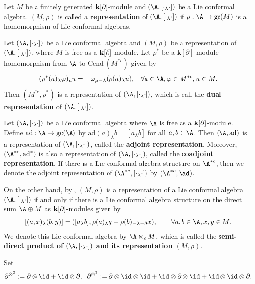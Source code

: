 \documentclass[12pt]{amsart}
\begin{document}
    \begin{definition}\cite{K1}
        Let $M$ be a finitely generated ${\bf k}[\partial]$-module and $(\A,[\cdot_\lambda \cdot])$ be a Lie conformal algebra. $(M, \rho)$ is called a {\bf  representation} of $(\A,[\cdot_\lambda \cdot])$ if $\rho: \A\rightarrow \text{gc}(M)$ is a homomorphism of Lie conformal algebras.
    \end{definition}

    \begin{proposition}\cite{L}\label{prop-dual}
        Let $(\A,[\cdot_\lambda \cdot])$ be a Lie conformal algebra and $(M, \rho)$ be a representation of $(\A,[\cdot_\lambda \cdot])$, where $M$ is free as a ${\bf k}[\partial]$-module. Let $\rho^*$ be a $\mathbf{k}[\partial]$-module homomorphism from $\A$ to $\mathrm{Cend}~(M^{*c})$ given by
        \begin{eqnarray*}
            (\rho^\ast(a)_\lambda \varphi)_\mu u=-\varphi_{\mu-\lambda}(\rho(a)_\lambda u),\;\;\;\forall a\in \A, \varphi\in M^{\ast c}, u\in M.
        \end{eqnarray*}
        Then   $(M^{\ast c}, \rho^\ast)$ is a representation of $(\A,[ \cdot_\lambda\cdot])$, which is call the {\bf  dual representation}  of $(\A,[ \cdot_\lambda\cdot])$.
         \end{proposition}
        \begin{example}
        	Let $(\A,[\cdot_\lambda \cdot])$ be a Lie conformal algebra where $\A$ is free as a ${\bf k}[\partial]$-module.
        Define $\mathrm{ad}:\A\rightarrow \text{gc}(\A)$ by $\mathrm{ad}(a)_\lambda b=[a_\lambda b]$ for all $a,b\in \A$. Then $(\A,\mathrm{ad})$ is a representation of $(\A,[\cdot_\lambda \cdot])$, called the {\bf adjoint representation}. Moreover, $(\A^{*c},\mathrm{ad}^*)$ is also a representation of $(\A,[\cdot_\lambda \cdot])$, called the {\bf coadjoint representation}. If there is a Lie conformal algebra structure on $\A^{\ast c}$, then we denote the adjoint representation of $(\A^{\ast c}, [\cdot_\lambda \cdot])$ by $(\A^{\ast c}, \ad)$.

        On the other hand, by \cite[Proposition 3.1]{HL1}, $(M,\rho)$ is a representation of a Lie conformal algebra $(\A,[\cdot_\lambda\cdot])$ if and only if there is a Lie conformal algebra structure on the direct sum $\A\oplus M$ as ${\bf k}[\partial]$-modules given by
        \begin{equation}\label{eq-rep}
            [(a,x)_\lambda (b,y)]=([a_\lambda b],\rho(a)_\lambda y-\rho(b)_{-\lambda-\partial}x),\qquad \forall a,b\in\A,x,y\in M.
        \end{equation}
        We denote this Lie conformal algebra by $\A\ltimes_{\rho} M$, which is called the {\bf semi-direct product of $(\A,[\cdot_\lambda\cdot])$ and its representation $(M, \rho)$}.

\end{example}
    Set
   \begin{eqnarray*}
       \partial^{\otimes^2}:=\partial \otimes \id+\id\otimes \partial,\;\;\partial^{\otimes^3}:=\partial\otimes \id\otimes \id+\id\otimes \partial\otimes \id+\id\otimes \id\otimes
     \partial.
    \end{eqnarray*}
 
\end{document}
